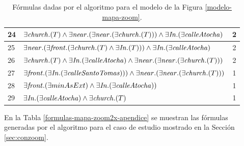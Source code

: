 \begin{table}[h]
\begin{center}
\begin{tabular}{|l|l|c|}
24&$\exists \mathit{church}.(T) \land \exists \mathit{near}.(\exists \mathit{near}.(\exists \mathit{church}.(T))) \land \exists \mathit{In} .(\exists \mathit{calleAtocha})$ &2\\ \hline

25&$\exists  \mathit{near}.(\exists \mathit{front}.(\exists \mathit{church}.(T) \land \exists \mathit{In} .(T))) \land \exists \mathit{In} .(\exists \mathit{calleAtocha})$ &2\\ \hline

26&$\exists \mathit{church}.(T) \land \exists \mathit{In} .(\exists \mathit{calleAtocha}) \land \exists \mathit{near}.(\exists \mathit{near}.(\exists \mathit{church}.(T)))$ &2\\ \hline

27&$\exists \mathit{front}.(\exists \mathit{In} .(\exists \mathit{calleSantoTomas}))) \land \exists \mathit{near}.(\exists \mathit{near}.(\exists \mathit{church}.(T)))$ &1\\ \hline

28&$\exists \mathit{front} . (\exists minAsExt) \land \exists \mathit{In} .(\exists \mathit{calleAtocha}))$ &1\\ \hline

29&$\exists  \mathit{In} .(\exists \mathit{calleAtocha}) \land \exists \mathit{church}.(T)$ &1\\ \hline

\end{tabular}

\caption{F\'ormulas dadas por el algoritmo para el modelo de la Figura \protect\ref{modelo-mapa-zoom}.}\label{formulas-mapa-zoom-ap}
\end{center}
\end{table}


En la Tabla \ref{formulas-mapa-zoom2x-apendice} se muestran las f\'ormulas generadas por el algoritmo para el caso de estudio mostrado en la Secci\'on \ref{sec:conzoom}.

